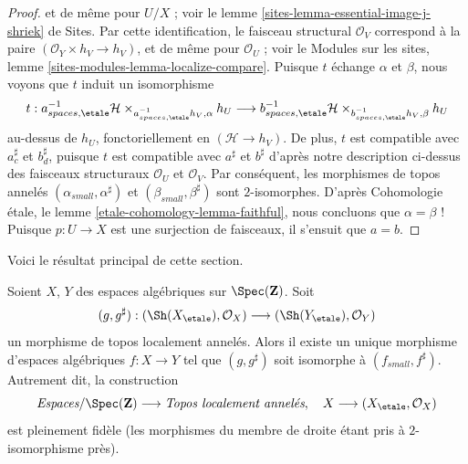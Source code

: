 \begin{proof}
et de même pour $U/X$ ; voir le
lemme \ref{sites-lemma-essential-image-j-shriek} de Sites.
Par cette identification, le faisceau structural $\mathcal{O}_V$ correspond à la
paire $(\mathcal{O}_Y \times h_V \to h_V)$, et de même
pour $\mathcal{O}_U$ ; voir le
Modules sur les sites,
lemme \ref{sites-modules-lemma-localize-compare}.
Puisque $t$ échange $\alpha$ et $\beta$, nous voyons que $t$ induit un isomorphisme
$$
t :
a_{spaces, \etale}^{-1}\mathcal{H}
\times_{a_{spaces, \etale}^{-1}h_V, \alpha}
h_U
\longrightarrow
b_{spaces, \etale}^{-1}\mathcal{H}
\times_{b_{spaces, \etale}^{-1}h_V, \beta}
h_U
$$
au-dessus de $h_U$, fonctoriellement en $(\mathcal{H} \to h_V)$. De plus, $t$ est compatible
avec $a_c^\sharp$ et $b_d^\sharp$, puisque $t$ est
compatible avec $a^\sharp$ et $b^\sharp$ d'après notre description
ci-dessus des faisceaux structuraux $\mathcal{O}_U$ et $\mathcal{O}_V$.
Par conséquent, les morphismes de topos annelés
$(\alpha_{small}, \alpha^\sharp)$ et $(\beta_{small}, \beta^\sharp)$
sont $2$-isomorphes. D'après
Cohomologie \'etale, le lemme \ref{etale-cohomology-lemma-faithful},
nous concluons que $\alpha = \beta$ ! Puisque $p : U \to X$ est une surjection
de faisceaux, il s'ensuit que $a = b$.
\end{proof}

\noindent
Voici le résultat principal de cette section.

\begin{theorem}
\label{theorem-fully-faithful}
Soient $X$, $Y$ des espaces algébriques sur $\Spec(\mathbf{Z})$.
Soit
$$
(g, g^\sharp) :
(\Sh(X_\etale), \mathcal{O}_X)
\longrightarrow
(\Sh(Y_\etale), \mathcal{O}_Y)
$$
un morphisme de topos localement annelés. Alors il existe un
unique morphisme d'espaces algébriques $f : X \to Y$ tel que
$(g, g^\sharp)$ soit isomorphe à $(f_{small}, f^\sharp)$.
Autrement dit, la construction
$$
\textit{Espaces}/\Spec(\mathbf{Z})
\longrightarrow \textit{Topos localement annelés},
\quad
X \longrightarrow (X_\etale, \mathcal{O}_X)
$$
est pleinement fidèle (les morphismes du membre de droite étant pris à $2$-isomorphisme près).
\end{theorem}


